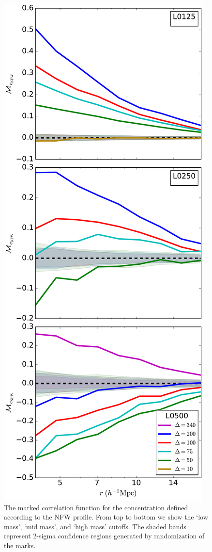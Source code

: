\documentclass[usenatbib,usegraphicx,letterpaper]{mn2e}
\begin{document}
\begin{figure}
	\centering
	\includegraphics[width=.4\textwidth]{all_mcf_cNFW.pdf}
	\caption{
The marked correlation function for the concentration defined according to the NFW profile. From top to bottom we show the `low mass', `mid mass', and `high mass' cutoffs. The shaded bands represent 2-sigma confidence regions generated by randomization of the marks.
}
	\label{fig:cc_mcf_cnfw}
\end{figure}
\end{document}

